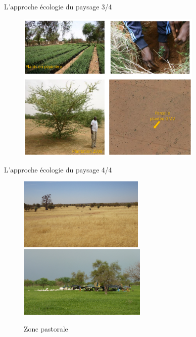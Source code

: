 \documentclass[newPxFont]{beamer}
\begin{document}
\begin{frame}[c]{L'approche écologie du paysage 3/4}
\vspace{-1cm}

\begin{figure}
  \hspace*{-0.5cm}
	\includegraphics[width = 9cm]{img/patches2.png}
\end{figure}

\end{frame}


\begin{frame}[c]{L'approche écologie du paysage 4/4}
\vspace{-1cm}
\begin{figure}
  \hspace*{-0.80cm}
	\includegraphics[height = 3.5cm]{img/pasto1.jpg}
  \includegraphics[height = 3.5cm]{img/pasto2.jpg}
  \caption{Zone pastorale}
\end{figure}

\end{frame}
\end{document}
